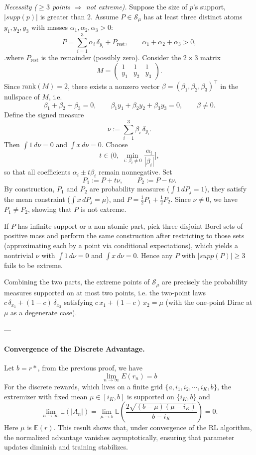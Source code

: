 \documentclass{article} %
\begin{document}
\medskip
\noindent\emph{Necessity ($\ge3$ points $\Rightarrow$ not extreme).} Suppose the size of $p$'s support, $|supp(p)|$ is greater than 2.  Assume $P\in\mathcal{S}_\mu$ has at least three distinct atoms $y_1,y_2,y_3$ with masses $\alpha_1,\alpha_2,\alpha_3>0$:
\[P=\sum_{i=1}^3 \alpha_i\,\delta_{y_i} + P_{\mathrm{rest}},
\qquad
\alpha_1+\alpha_2+\alpha_3>0,
\].where $P_{\mathrm{rest}}$ is the remainder (possibly zero). Consider the $2\times 3$ matrix
\[
M=
\begin{pmatrix}
1 & 1 & 1\\
y_1 & y_2 & y_3
\end{pmatrix}.
\]
Since $\mathrm{rank}(M)=2$, there exists a nonzero vector $\beta=(\beta_1,\beta_2,\beta_3)^\top$ in the nullspace of $M$, i.e.
\[
\beta_1+\beta_2+\beta_3=0, 
\qquad
\beta_1 y_1+\beta_2 y_2+\beta_3 y_3=0,
\qquad
\beta\neq 0.
\]
Define the signed measure
\[
\nu:=\sum_{i=1}^3 \beta_i\,\delta_{y_i}.
\]
Then $\int 1\,d\nu=0$ and $\int x\,d\nu=0$. Choose
\[
t \in \Big(0,\ \min_{\,i:\,\beta_i\neq 0}\frac{\alpha_i}{|\beta_i|}\Big],
\]
so that all coefficients $\alpha_i\pm t\beta_i$ remain nonnegative. Set
\[
P_1:=P+t\nu,\qquad P_2:=P-t\nu.
\]
By construction, $P_1$ and $P_2$ are probability measures ($\int 1\,dP_j=1$), they satisfy the mean constraint ($\int x\,dP_j=\mu$), and $P=\frac{1}{2}P_1+\frac{1}{2}P_2$. Since $\nu\neq 0$, we have $P_1\neq P_2$, showing that $P$ is not extreme.

If $P$ has infinite support or a non-atomic part, pick three disjoint Borel sets of positive mass and perform the same construction after restricting to those sets (approximating each by a point via conditional expectations), which yields a nontrivial $\nu$ with $\int1\,d\nu=0$ and $\int x\,d\nu=0$. Hence any $P$ with $\lvert supp(P)\rvert\ge 3$ fails to be extreme.

\medskip
Combining the two parts, the extreme points of $\mathcal{S}_\mu$ are precisely the probability measures supported on at most two points, i.e. the two-point laws $c\,\delta_{x_1}+(1-c)\,\delta_{x_2}$ satisfying $c\,x_1+(1-c)\,x_2=\mu$ (with the one-point Dirac at $\mu$ as a degenerate case).

---


\paragraph{Convergence of the Discrete Advantage.}  
Let $b = r*$, from the previous proof, we have 
\[
\lim_{n\to\infty} E(r_n) = b
\]
For the discrete rewards, which lives on a finite grid $\{a, i_1, i_2, \cdots, i_K, b\}$, the extremizer with fixed mean $\mu\in[i_K, b]$ is supported on $\{i_K, b\}$ and
\begin{equation}
    \lim_{n \to \infty} \mathbb{E}(|A_n|) = \lim_{\mu\to b}\mathbb{E}(\frac{2\sqrt{(b-\mu)(\mu-i_K)}}{b-i_K})=0.
\end{equation}
Here $\mu$ is $\mathbb{E}(r)$. This result shows that, under convergence of the RL algorithm, the normalized advantage vanishes asymptotically, ensuring that parameter updates diminish and training stabilizes.
\end{document}
